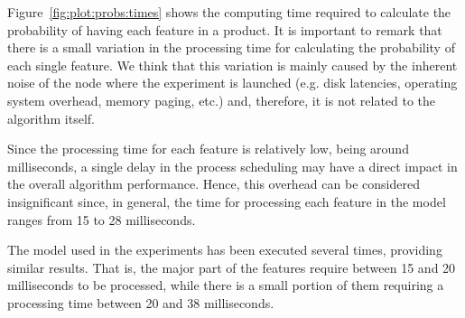 Figure~\ref{fig:plot:probs:times} shows the computing time required to calculate the probability of having
each feature in a product.
It is important to remark that there is a small variation in the processing time for calculating the probability of each single feature. We think that this variation is mainly caused by the inherent noise of the node where the experiment is launched (e.g. disk latencies, operating
system overhead, memory paging, etc.) and, therefore, it is not related to the algorithm itself.

Since the processing time for each feature is relatively low, being around milliseconds, a single delay in
the process scheduling may have a direct impact in the overall algorithm performance. Hence, this overhead
can be considered insignificant since, in general, the time for processing each feature in the model ranges
from 15 to 28 milliseconds.

The model used in the experiments has been executed several times, providing similar results. That is, the
major part of the features require between 15 and 20 milliseconds to be processed, while there is a small
portion of them requiring a processing time between 20 and 38 milliseconds.


